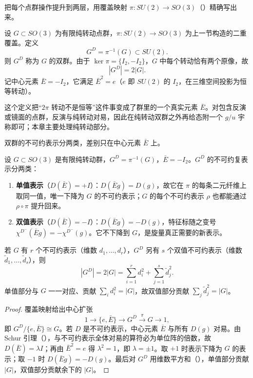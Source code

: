 把每个点群操作提升到两层，用覆盖映射 $\pi:SU(2)\to SO(3)$（）精确写出来。

\begin{definition}[旋转点群的双群]
设 $G\subset SO(3)$ 为有限纯转动点群，$\pi:SU(2)\to SO(3)$ 为上一节构造的二重覆盖。定义
\[
G^D=\pi^{-1}(G)\subset SU(2).
\]
则 $G^D$ 称为 $G$ 的双群。由于 $\ker\pi=\{I_2,-I_2\}$，$G$ 中每个转动恰有两个原像，故
\[
|G^D|=2|G|.
\]
记中心元素 $\bar E=-I_2$，它满足 $\bar E^2=e$（$e$ 即 $SU(2)$ 的 $I_2$，在三维空间投影为恒等转动）。
\label{def:double-group}
\end{definition}

这个定义把“$2\pi$ 转动不是恒等”这件事变成了群里的一个真实元素 $\bar E$。对包含反演或镜面的点群，反演与纯转动对易，因此在纯转动双群之外再给态附一个 $g/u$ 宇称即可；本章主要处理纯转动部分。

双群的不可约表示分两类，差别只在中心元素 $\bar E$ 上。

\begin{proposition}[双群不可约表示的两类]
\label{prop:double-group-char}
设 $G\subset SO(3)$ 是有限纯转动群，$G^D=\pi^{-1}(G)$，$\bar E=-I_2$。$G^D$ 的不可约复表示分两类：
\begin{enumerate}[label=(\roman*),leftmargin=3em]
\item \textbf{单值表示}（$D(\bar E)=+I$）：$D(\bar Eg)=D(g)$，故它在 $\pi$ 的每条二元纤维上取同一值，唯一下降为 $G$ 的不可约表示；$G$ 的每个不可约表示 $\rho$ 也都能通过 $\rho\circ\pi$ 提升回来。
\item \textbf{双值表示}（$D(\bar E)=-I$）：$D(\bar Eg)=-D(g)$，特征标随之变号 $\chi^{D^-}(\bar Eg)=-\chi^{D^-}(g)$。它不下降到 $G$，是旋量真正需要的新表示。
\end{enumerate}
若 $G$ 有 $r$ 个不可约表示（维数 $d_1,\dots,d_r$），$G^D$ 另有 $s$ 个双值不可约表示（维数 $\tilde d_1,\dots,\tilde d_s$），则
\[
|G^D|=2|G|=\sum_{i=1}^r d_i^2+\sum_{j=1}^s\tilde d_j^2.
\]
单值部分与 $G$ 一一对应、贡献 $\sum_i d_i^2=|G|$，故双值部分贡献 $\sum_j\tilde d_j^2=|G|$。
\end{proposition}

\begin{proof}
覆盖映射给出中心扩张
\[
1\longrightarrow\{e,\bar E\}\longrightarrow G^D\overset{\pi}{\longrightarrow}G\longrightarrow1,
\]
即 $G^D/\{e,\bar E\}\cong G$。若 $D$ 是不可约表示，中心元素 $\bar E$ 与所有 $D(g)$ 对易。由 Schur 引理（），与不可约表示全体对易的算符必为单位阵的倍数，故 $D(\bar E)=\lambda I$；再由 $\bar E^2=e$ 得 $\lambda^2=1$，即 $\lambda=\pm1$。取 $+1$ 时表示下降为 $G$ 的表示；取 $-1$ 时 $D(\bar Eg)=-D(g)$。最后对 $G^D$ 用维数平方和（），单值部分贡献 $|G|$，双值部分贡献余下的 $|G|$。
\end{proof}

